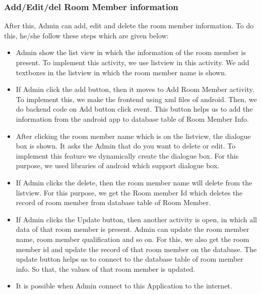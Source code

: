 \subsubsection{Add/Edit/del Room Member information}
After this, Admin can add, edit and delete the room member information. To do this, he/she follow these steps which are given below: 
\begin{itemize}

\item Admin show the list view in which the information of the room member is present. To implement this activity, we use listview in this activity. We add textboxes in the listview in which the room member name is shown.
\item If Admin click the add button, then it moves to Add Room Member activity. To implement this, we make the frontend using xml files of android. Then, we do backend code on Add button click event. This button helps us to add the information from the android app to database table of Room Member Info. 
\item After clicking the room member name which is on the listview, the dialogue box is shown. It asks the Admin that do you want to delete or edit. To implement this feature we dynamically create the dialogue box. For this purpose, we used libraries of android which support dialogue box. 
\item If Admin clicks the delete, then the room member name will delete from the listview. For this purpose, we get the Room member Id which deletes the record of room member from database table of Room Member. 
\item If Admin clicks the Update button, then another activity is open, in which all data of that room member is present. Admin can update the room member name, room member qualification and so on. For this, we also get the room member id and update the record of that room member on the database. The update button helps us to connect to the database table of room member info. So that, the values of that room member is updated.
\item It is possible when Admin connect to this Application to the internet.

\end{itemize}

